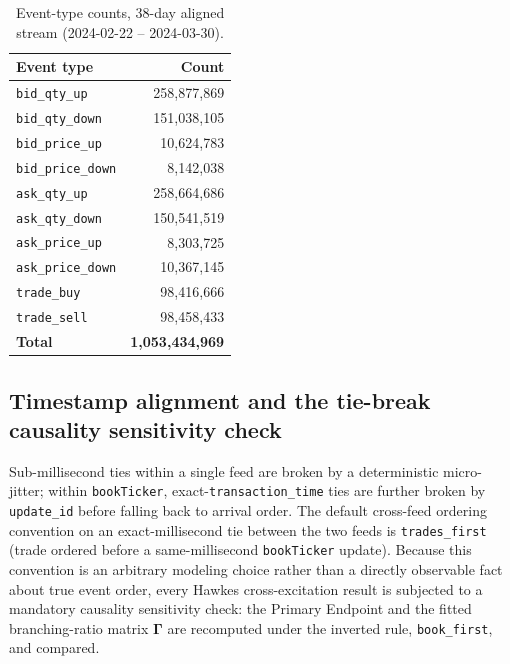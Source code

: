 \begin{table}[htbp]
\centering
\caption{Event-type counts, 38-day aligned stream (2024-02-22 -- 2024-03-30).}
\label{tab:event-counts}
\begin{tabular}{@{}lr@{}}
\toprule
Event type & Count \\
\midrule
\texttt{bid\_qty\_up}    & 258{,}877{,}869 \\
\texttt{bid\_qty\_down}  & 151{,}038{,}105 \\
\texttt{bid\_price\_up}   & 10{,}624{,}783 \\
\texttt{bid\_price\_down} & 8{,}142{,}038 \\
\texttt{ask\_qty\_up}    & 258{,}664{,}686 \\
\texttt{ask\_qty\_down}  & 150{,}541{,}519 \\
\texttt{ask\_price\_up}   & 8{,}303{,}725 \\
\texttt{ask\_price\_down} & 10{,}367{,}145 \\
\texttt{trade\_buy}      & 98{,}416{,}666 \\
\texttt{trade\_sell}     & 98{,}458{,}433 \\
\midrule
\textbf{Total} & \textbf{1{,}053{,}434{,}969} \\
\bottomrule
\end{tabular}
\end{table}

\subsection{Timestamp alignment and the tie-break causality sensitivity check}
\label{sec:data-tiebreak}

Sub-millisecond ties within a single feed are broken by a deterministic
micro-jitter; within \texttt{bookTicker}, exact-\texttt{transaction\_time}
ties are further broken by \texttt{update\_id} before falling back to
arrival order. The default cross-feed ordering convention on an
exact-millisecond tie between the two feeds is \texttt{trades\_first}
(trade ordered before a same-millisecond \texttt{bookTicker} update).
Because this convention is an arbitrary modeling choice rather than a
directly observable fact about true event order, every Hawkes cross-excitation
result is subjected to a mandatory causality sensitivity check: the
Primary Endpoint and the fitted branching-ratio matrix
$\boldsymbol{\Gamma}$ are recomputed under the inverted rule,
\texttt{book\_first}, and compared.

